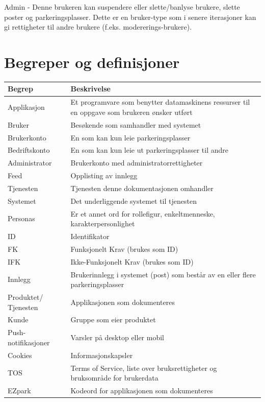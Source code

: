 \documentclass[12pt]{article}
\begin{document}
Admin - Denne brukeren kan suspendere eller slette/banlyse brukere, slette poster og parkeringsplasser. Dette er en bruker-type som i senere iterasjoner kan gi rettigheter til andre brukere (f.eks. modererings-brukere).


\section{Begreper og definisjoner}

\begin{center}
    \begin{tabular}{|p{4cm}|p{12cm}|} 
        \hline
        \bf Begrep & \bf Beskrivelse\\
        \hline
        Applikasjon &  Et programvare som benytter datamaskinens ressurser til en oppgave som brukeren ønsker utført\\
        \hline
        Bruker & Besøkende som samhandler med systemet\\
        \hline
        Brukerkonto & En som kan kun leie parkeringsplasser\\
        \hline
        Bedriftskonto & En som kan kun leie ut parkeringsplasser til andre\\
        \hline
        Administrator & Brukerkonto med administratorrettigheter\\
        \hline
        Feed & Opplisting av innlegg\\
        \hline
        Tjenesten & Tjenesten denne dokumentasjonen omhandler\\
        \hline
        Systemet & Det underliggende systemet til tjenesten\\
        \hline
        Personas & Er et annet ord for rollefigur, enkeltmenneske, karakterpersonlighet\\
        \hline
        ID & Identifikator\\
        \hline
        FK & Funksjonelt Krav (brukes som ID)\\
        \hline
        IFK & Ikke-Funksjonelt Krav (brukes som ID)\\
        \hline
        Innlegg & Brukerinnlegg i systemet (post) som består av en eller flere parkeringsplasser\\
        \hline
        Produktet/ Tjenesten & Applikasjonen som dokumenteres\\
        \hline
        Kunde & Gruppe som eier produktet\\
        \hline
        Push-notifikasjoner & Varsler på desktop eller mobil \\
        \hline
        Cookies & Informasjonskapsler \\
        \hline
        TOS & Terms of Service, liste over bruksrettigheter og bruksområde for brukerdata \\
        \hline
        EZpark & Kodeord for applikasjonen som dokumenteres \\
        \hline
    \end{tabular}
\end{center}
\end{document}
